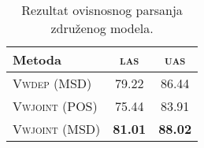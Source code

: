 \begin{table}
\centering
\caption{Rezultat ovisnosnog parsanja združenog modela.}
\label{table:depparsing:joint}
\begin{tabular}{|l|c|c|}
\hline
Metoda                 & \textsc{las}   & \textsc{uas}    \\ \hline \hline
\textsc{Vwdep}   (MSD) & 79.22          & 86.44           \\
\textsc{Vwjoint} (POS) & 75.44          & 83.91           \\
\textsc{Vwjoint} (MSD) & \textbf{81.01} & \textbf{88.02}  \\ \hline
\end{tabular}
\end{table}
